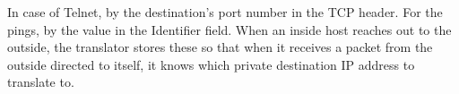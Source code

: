 In case of Telnet, by the destination's port number in the TCP header. For the pings,
by the value in the Identifier field. When an inside host reaches out to the outside,
the translator stores these so that when it receives a packet from the outside directed
to itself, it knows which private destination IP address to translate to.
